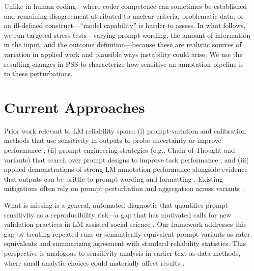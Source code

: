 \documentclass{article}
\begin{document}
Unlike in human coding---where coder competence can sometimes be established and remaining disagreement attributed to unclear criteria, problematic data, or an ill-defined construct---``model capability'' is harder to assess. In what follows, we run targeted stress tests---varying prompt wording, the amount of information in the input, and the outcome definition---because these are realistic sources of variation in applied work and plausible ways instability could arise. We use the resulting changes in PSS to characterize how sensitive an annotation pipeline is to these perturbations.

\section{Current Approaches}

Prior work relevant to LM reliability spans: (i) prompt-variation and calibration methods that use sensitivity in outputs to probe uncertainty or improve performance \citep{chen_quantifying_2023, shin_autoprompt_2020, portillo_wightman_strength_2023, zhao_calibrate_2021, arora_ask_2022, chen_relation_2023, schick_exploiting_2021, tian_just_2023, feffer2024prompt}; (ii) prompt-engineering strategies (e.g., Chain-of-Thought and variants) that search over prompt designs to improve task performance \citep{wei2022chain, liu2021generated, long2023large, wang2022self, madaan2023self, perez2021true, liu2023pre}; and (iii) applied demonstrations of strong LM annotation performance alongside evidence that outputs can be brittle to prompt wording and formatting \citep{gilardi2023chatgpt, tornberg2023chatgpt, bang2023multitask, qin2023chatgpt, goyal2022news, chiang2023can, grossmann2023, ziems2024can, dentella2023systematic, bisbee2023artificially, sclar2023quantifying}. Existing mitigations often rely on prompt perturbation and aggregation across variants \citep{tornberg2023chatgpt, ziems2024can}.

What is missing is a general, automated diagnostic that quantifies prompt sensitivity as a reproducibility risk---a gap that has motivated calls for new validation practices in LM-assisted social science \citep{ziems2024can, bail2024can}. Our framework addresses this gap by treating repeated runs or semantically equivalent prompt variants as rater equivalents and summarizing agreement with standard reliability statistics. This perspective is analogous to sensitivity analysis in earlier text-as-data methods, where small analytic choices could materially affect results \citep{denny2018text}.
\end{document}
